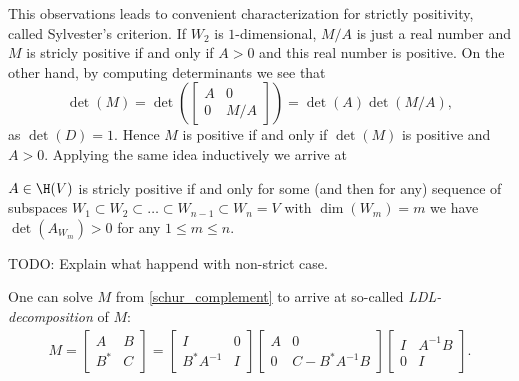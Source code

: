 This observations leads to convenient characterization for strictly positivity, called Sylvester's criterion. If $W_{2}$ is $1$-dimensional, $M/A$ is just a real number and $M$ is stricly positive if and only if $A > 0$ and this real number is positive. On the other hand, by computing determinants we see that
\[
	\det(M) = \det \left(
	\begin{bmatrix}
		A & 0 \\
		0 & M/A
	\end{bmatrix}
	\right)
	=
	\det(A) \det(M/A),
\]
as $\det(D) = 1$. Hence $M$ is positive if and only if $\det(M)$ is positive and $A > 0$. Applying the same idea inductively we arrive at
\begin{lause}
	$A \in \H(V)$ is stricly positive if and only for some (and then for any) sequence of subspaces $W_{1} \subset W_{2} \subset \ldots \subset W_{n - 1} \subset W_{n} = V$ with $\dim(W_{m}) = m$ we have $\det(A_{W_{m}}) > 0$ for any $1 \leq m \leq n$.
\end{lause}

TODO: Explain what happend with non-strict case.

One can solve $M$ from \ref{schur_complement} to arrive at so-called \textit{LDL-decomposition} of $M$:
\begin{align}\label{ldl_decomposition}
	M =
	\begin{bmatrix}
		A & B \\
		B^{*} & C
	\end{bmatrix}
	=
	\begin{bmatrix}
		I & 0 \\
		B^{*} A^{-1}  & I
	\end{bmatrix}
	\begin{bmatrix}
		A & 0 \\
		0 & C - B^{*} A^{-1} B
	\end{bmatrix}
	\begin{bmatrix}
		I & A^{-1} B \\
		0 & I
	\end{bmatrix}.
\end{align}

